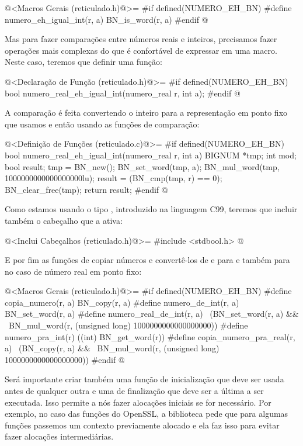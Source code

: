 \iniciocodigo
@<Macros Gerais (reticulado.h)@>=
#if defined(NUMERO_EH_BN)
#define numero_eh_igual_int(r, a) BN_is_word(r, a)
#endif
@
\fimcodigo

Mas para fazer comparações entre números reais e inteiros, precisamos
fazer operações mais complexas do que é confortável de expressar em
uma macro. Neste caso, teremos que definir uma função:

\iniciocodigo
@<Declaração de Função (reticulado.h)@>=
#if defined(NUMERO_EH_BN)
bool numero_real_eh_igual_int(numero_real r, int a);
#endif
@
\fimcodigo

A comparação é feita convertendo o inteiro para a representação em
ponto fixo que usamos e então usando as funções de comparação:

\iniciocodigo
@<Definição de Funções (reticulado.c)@>=
#if defined(NUMERO_EH_BN)
bool numero_real_eh_igual_int(numero_real r, int a){
  BIGNUM *tmp;
  int mod;
  bool result;
  tmp = BN_new();
  BN_set_word(tmp, a);
  BN_mul_word(tmp, 1000000000000000000lu);
  result = (BN_cmp(tmp, r) == 0);
  BN_clear_free(tmp);
  return result;
}
#endif
@

Como estamos usando o tipo , introduzido na linguagem
C99, teremos que incluir também o cabeçalho que a ativa:

\iniciocodigo
@<Inclui Cabeçalhos (reticulado.h)@>=
#include <stdbool.h>
@
\fimcodigo


E por fim as funções de copiar números e convertê-los de e
para  e também para  no caso de
número real em ponto fixo:

\iniciocodigo
@<Macros Gerais (reticulado.h)@>=
#if defined(NUMERO_EH_BN)
#define copia_numero(r, a) BN_copy(r, a)
#define numero_de_int(r, a) BN_set_word(r, a)
#define numero_real_de_int(r, a) \
          (BN_set_word(r, a) &&  \
           BN_mul_word(r, (unsigned long) 1000000000000000000))
#define numero_pra_int(r) ((int) BN_get_word(r))
#define copia_numero_pra_real(r, a) \
          (BN_copy(r, a) &&         \
          BN_mul_word(r, (unsigned long) 1000000000000000000))
#endif
@
\fimcodigo

Será importante criar também uma função de inicialização que deve ser
usada antes de qualquer outra e uma de finalização que deve ser a
última a ser executada. Isso permite a nós fazer alocações iniciais se
for necessário. Por exemplo, no caso das funções do OpenSSL, a
biblioteca pede que para algumas funções passemos um contexto
previamente alocado e ela faz isso para evitar fazer alocações
intermediárias.

